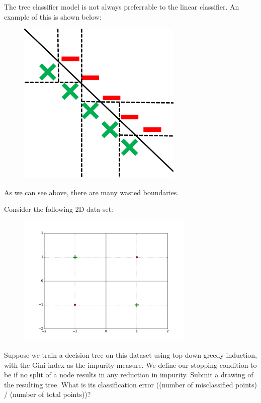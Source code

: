 \begin{solution}
  The tree classifier model is not always preferrable to the linear classifier. An example of this is shown below:
  \begin{figure}[H]
    \begin{center}
    \includegraphics[width=0.7\textwidth]{LinSepSet.pdf}
    \end{center}
    \end{figure}
    As we can see above, there are many wasted boundaries.
\end{solution}

\problem[15]
Consider the following 2D data set:
\begin{figure}[H]
    \begin{center}
    \includegraphics[width=3.3in]{plots/3C.png}
    \end{center}
    \end{figure}

\subproblem[5] Suppose we train a decision tree on this dataset using top-down greedy induction, with the Gini index as
the impurity measure. We define our stopping condition to be if no split of a node
results in any reduction in impurity. Submit a drawing of the resulting tree.  What is its classification error ((number of misclassified points) / (number of total points))?

